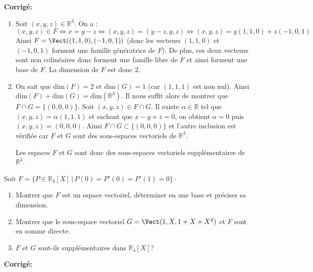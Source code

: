 \documentclass[a4paper,twoside,french,10pt]{VcCours}
\newcommand{\corr}{\textbf{Corrigé:}}
\begin{document}
\corr \begin{enumerate}
\item Soit $(x,y,z) \in \mathbb{R}^3$. On a :
$$ (x,y,z) \in F \Longleftrightarrow x=y-z \Longleftrightarrow (x,y,z) = (y-z,y,z) \Longleftrightarrow (x,y,z) = y(1,1,0) + z(-1,0,1)$$
Ainsi $F = \Vect((1,1,0), (-1,0,1))$ (donc les vecteurs $(1,1,0)$ et $(-1,0,1)$ forment une famille génératrice de $F$). De plus, ces deux vecteurs sont non colinéaires donc forment une famille libre de $F$ et ainsi forment une base de $F$. La dimension de $F$ est donc $2$.
\item On sait que $\textrm{dim}(F)=2$ et $\textrm{dim}(G)=1$ (car $(1,1,1)$ est non nul). Ainsi $\textrm{dim}(F) + \textrm{dim}(G) = \textrm{dim}(\mathbb{R}^3)$. Il nous suffit alors de montrer que $F \cap G = \lbrace (0,0,0) \rbrace$. Soit $(x,y,z) \in F \cap G$. Il existe $\alpha \in \mathbb{R}$ tel que $(x,y,z) = \alpha (1,1,1)$ et sachant que $x-y+z=0$, on obtient $\alpha = 0$ puis $(x,y,z)=(0,0,0)$. Ainsi $F \cap G \subset \lbrace (0,0,0) \rbrace$ et l'autre inclusion est vérifiée car $F$ et $G$ sont des sous-espaces vectoriels de $\mathbb{R}^3$.

\medskip

Les espaces $F$ et $G$ sont donc des sous-espaces vectoriels supplémentaires de $\mathbb{R}^3$.
\end{enumerate}

\medskip


\begin{Exercice}{} Soit $F = \lbrace P \in \mathbb{R}_4[X] \, \vert \, P(0)=P'(0)=P'(1)=0 \rbrace \cdot$

\begin{enumerate}
\item Montrer que $F$ est un espace vectoriel, déterminer en une base et préciser sa dimension.
\item Montrer que le sous-espace vectoriel $G= \Vect(1,X,1+X+X^2)$ et $F$  sont en somme directe.
\item $F$ et $G$ sont-ils supplémentaires dans $\mathbb{R}_4[X]$?
\end{enumerate}
\end{Exercice}

\corr 
\end{document}
